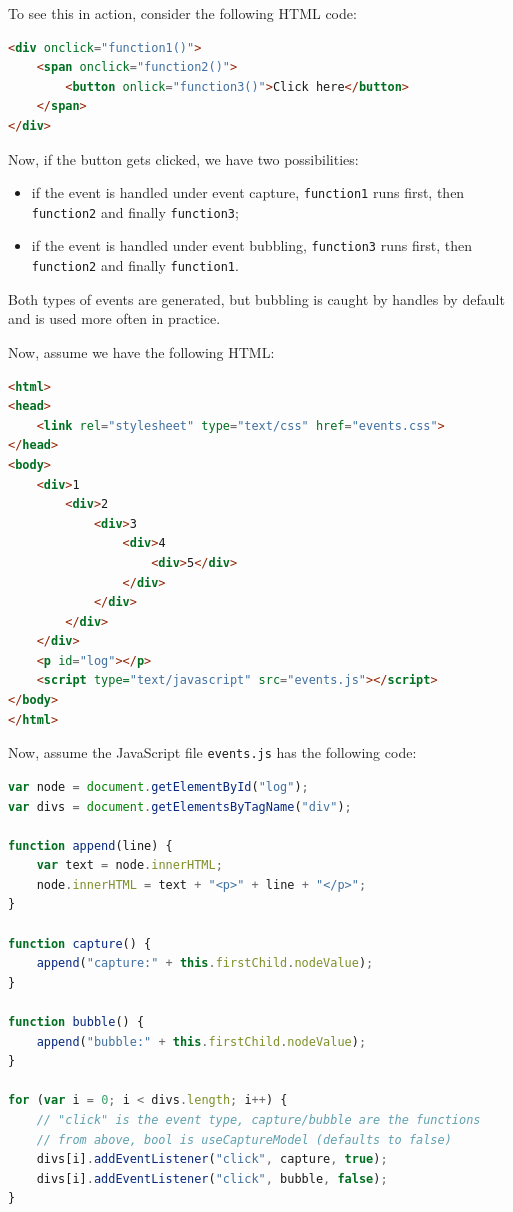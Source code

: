 \documentclass[a4paper, openany]{memoir}
\begin{document}
\noindent To see this in action, consider the following HTML code:
\begin{lstlisting}[language=html]
<div onclick="function1()">
    <span onclick="function2()">
        <button onlick="function3()">Click here</button>
    </span>
</div>
\end{lstlisting}
Now, if the button gets clicked, we have two possibilities:
\begin{itemize}
    \item if the event is handled under event capture, \texttt{function1} runs first, then \texttt{function2} and finally \texttt{function3};
    \item if the event is handled under event bubbling, \texttt{function3} runs first, then \texttt{function2} and finally \texttt{function1}.
\end{itemize}
Both types of events are generated, but bubbling is caught by handles by default and is used more often in practice.

\noindent Now, assume we have the following HTML:
\begin{lstlisting}[language=html]
<html>
<head>
    <link rel="stylesheet" type="text/css" href="events.css">
</head>
<body>
    <div>1
        <div>2
            <div>3
                <div>4
                    <div>5</div> 
                </div>
            </div>
        </div>
    </div>
    <p id="log"></p>
    <script type="text/javascript" src="events.js"></script>
</body>
</html>
\end{lstlisting}
Now, assume the JavaScript file \texttt{events.js} has the following code:
\begin{lstlisting}[language=javascript]
var node = document.getElementById("log");
var divs = document.getElementsByTagName("div");

function append(line) {
    var text = node.innerHTML;
    node.innerHTML = text + "<p>" + line + "</p>";
}

function capture() {
    append("capture:" + this.firstChild.nodeValue);
}

function bubble() {
    append("bubble:" + this.firstChild.nodeValue);
}

for (var i = 0; i < divs.length; i++) {
    // "click" is the event type, capture/bubble are the functions 
    // from above, bool is useCaptureModel (defaults to false)
    divs[i].addEventListener("click", capture, true);
    divs[i].addEventListener("click", bubble, false);
}
\end{lstlisting}
\end{document}
